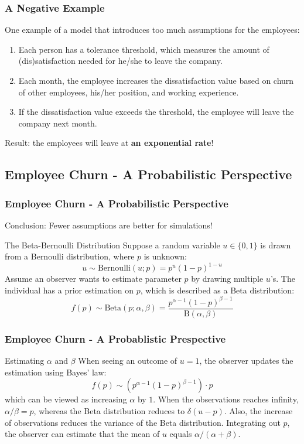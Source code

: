 \documentclass{beamer}
\begin{document}
\begin{frame}
\frametitle{A Negative Example}
One example of a model that introduces too much assumptions for the employees:
\begin{enumerate}
\item Each person has a tolerance threshold, which measures the amount of (dis)satisfaction needed for he/she to leave the company.
\item Each month, the employee increases the dissatisfaction value based on churn of other employees, his/her position, and working experience.
\item If the dissatisfaction value exceeds the threshold, the employee will leave the company next month.
\end{enumerate}
Result: the employees will leave at {\bf an exponential rate}!
\end{frame}
\subsection{Employee Churn - A Probabilistic Perspective}

\begin{frame}
\frametitle{Employee Churn - A Probabilistic Perspective}
Conclusion: Fewer assumptions are better for simulations!
\begin{block}{The Beta-Bernoulli Distribution}
Suppose a random variable $u\in \{0,1\}$ is drawn from a Bernoulli distribution, where $p$ is unknown:
\begin{equation}
u \sim \mathrm{Bernoulli}(u;p)=p^u(1-p)^{1-u}
\end{equation}
Assume an observer wants to estimate parameter $p$ by drawing multiple $u$'s. The individual has a prior estimation on $p$, which is described as a Beta distribution:
\begin{equation}
f(p)\sim \mathrm{Beta}(p;\alpha, \beta) = \frac{p^{\alpha-1}(1-p)^{\beta-1}}{\mathrm{B}(\alpha, \beta)}
\end{equation}
\end{block}
\end{frame}

\begin{frame}
\frametitle{Employee Churn - A Probablistic Prespective}
\begin{block}{Estimating $\alpha$ and $\beta$}
When seeing an outcome of $u=1$, the observer updates the estimation using Bayes' law:
\begin{equation}
f(p)\sim (p^{\alpha - 1}(1-p)^{\beta-1})\cdot p
\end{equation}
which can be viewed as increasing $\alpha$ by $1$. When the observations reaches infinity, $\alpha/\beta=p$, whereas the Beta distribution reduces to $\delta(u-p)$. Also, the increase of observations reduces the variance of the Beta distribution. Integrating out $p$, the observer can estimate that the mean of $u$ equals $\alpha/(\alpha+\beta)$.

\end{block}
\end{frame}
\end{document}
